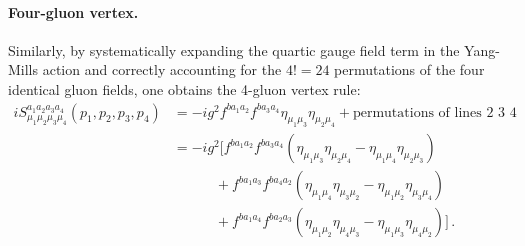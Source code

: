 \paragraph{Four-gluon vertex.}
Similarly, by systematically expanding the quartic gauge field term in the Yang-Mills action and correctly accounting for the \(4! = 24\) permutations of the four identical gluon fields, one obtains the 4-gluon vertex rule:
\begin{equation} \label{eq:four_gluon_vertex}
    \begin{aligned}
        iS^{a_1 a_2 a_3 a_4}_{\mu_1 \mu_2 \mu_3 \mu_4}(p_1, p_2, p_3, p_4) & = -ig^2 f^{b a_1 a_2} f^{b a_3 a_4} \eta_{\mu_1 \mu_3} \eta_{\mu_2 \mu_4} + \text{permutations of lines 2 3 4}                       \\
                                                                           & = -ig^2 \big[ f^{b a_1 a_2} f^{b a_3 a_4} (\eta_{\mu_1 \mu_3} \eta_{\mu_2 \mu_4} - \eta_{\mu_1 \mu_4} \eta_{\mu_2 \mu_3})            \\
                                                                           & \qquad\quad + f^{b a_1 a_3} f^{b a_4 a_2} (\eta_{\mu_1 \mu_4} \eta_{\mu_3 \mu_2} - \eta_{\mu_1 \mu_2} \eta_{\mu_3 \mu_4})            \\
                                                                           & \qquad\quad + f^{b a_1 a_4} f^{b a_2 a_3} (\eta_{\mu_1 \mu_2} \eta_{\mu_4 \mu_3} - \eta_{\mu_1 \mu_3} \eta_{\mu_4 \mu_2}) \big] \, .
    \end{aligned}
\end{equation}

